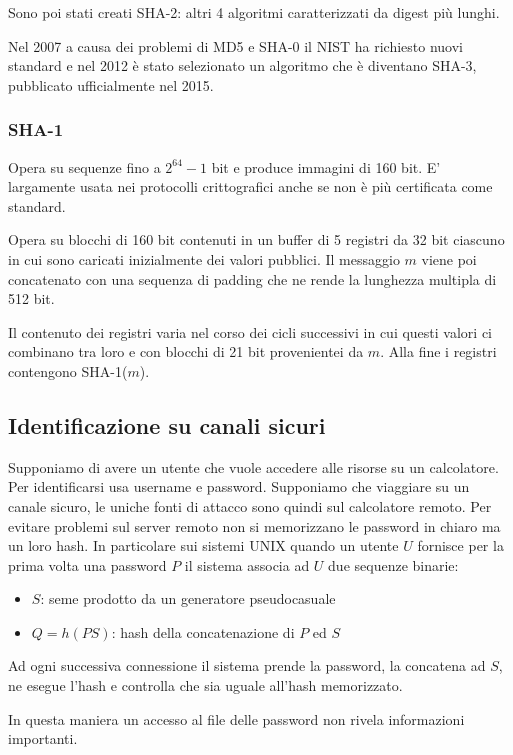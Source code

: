 Sono poi stati creati SHA-2: altri 4 algoritmi caratterizzati da digest più lunghi.

Nel 2007 a causa dei problemi di MD5 e SHA-0 il NIST ha richiesto nuovi standard e nel 2012 è stato selezionato un algoritmo che è diventano SHA-3, pubblicato ufficialmente nel 2015.

\subsubsection{SHA-1}
Opera su sequenze fino a $2^{64}-1$ bit e produce immagini di 160 bit.
E' largamente usata nei protocolli crittografici anche se non è più certificata come standard.

Opera su blocchi di 160 bit contenuti in un buffer di 5 registri da 32 bit ciascuno in cui sono caricati inizialmente dei valori pubblici.
Il messaggio $m$ viene poi concatenato con una sequenza di padding che ne rende la lunghezza multipla di 512 bit.

Il contenuto dei registri varia nel corso dei cicli successivi in cui questi valori ci combinano tra loro e con blocchi di 21 bit provenientei da $m$.
Alla fine i registri contengono SHA-1($m$).

\subsection{Identificazione su canali sicuri}
Supponiamo di avere un utente che vuole accedere alle risorse su un calcolatore.
Per identificarsi usa username e password.
Supponiamo che viaggiare su un canale sicuro, le uniche fonti di attacco sono quindi sul calcolatore remoto.
Per evitare problemi sul server remoto non si memorizzano le password in chiaro ma un loro hash.
In particolare sui sistemi UNIX quando un utente $U$ fornisce per la prima volta una password $P$ il sistema associa ad $U$ due sequenze binarie:
\begin{itemize}
    \item $S$: seme prodotto da un generatore pseudocasuale
    \item $Q = h(PS)$: hash della concatenazione di $P$ ed $S$
\end{itemize}

Ad ogni successiva connessione il sistema prende la password, la concatena ad $S$, ne esegue l'hash e controlla che sia uguale all'hash memorizzato.

In questa maniera un accesso al file delle password non rivela informazioni importanti.

